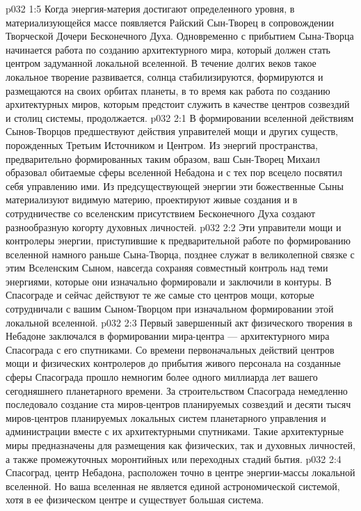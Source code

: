 \vs p032 1:5 \pc Когда энергия\hyp{}материя достигают определенного уровня, в материализующейся массе появляется Райский Сын\hyp{}Творец в сопровождении Творческой Дочери Бесконечного Духа. Одновременно с прибытием Сына\hyp{}Творца начинается работа по созданию архитектурного мира, который должен стать центром задуманной локальной вселенной. В течение долгих веков такое локальное творение развивается, солнца стабилизируются, формируются и размещаются на своих орбитах планеты, в то время как работа по созданию архитектурных миров, которым предстоит служить в качестве центров созвездий и столиц системы, продолжается.
\vs p032 2:1 В формировании вселенной действиям Сынов\hyp{}Творцов предшествуют действия управителей мощи и других существ, порожденных Третьим Источником и Центром. Из энергий пространства, предварительно формированных таким образом, ваш Сын\hyp{}Творец Михаил образовал обитаемые сферы вселенной Небадона и с тех пор всецело посвятил себя управлению ими. Из предсуществующей энергии эти божественные Сыны материализуют видимую материю, проектируют живые создания и в сотрудничестве со вселенским присутствием Бесконечного Духа создают разнообразную когорту духовных личностей.
\vs p032 2:2 Эти управители мощи и контролеры энергии, приступившие к предварительной работе по формированию вселенной намного раньше Сына\hyp{}Творца, позднее служат в великолепной связке с этим Вселенским Сыном, навсегда сохраняя совместный контроль над теми энергиями, которые они изначально формировали и заключили в контуры. В Спасограде и сейчас действуют те же самые сто центров мощи, которые сотрудничали с вашим Сыном\hyp{}Творцом при изначальном формировании этой локальной вселенной.
\vs p032 2:3 \pc Первый завершенный акт физического творения в Небадоне заключался в формировании мира\hyp{}центра --- архитектурного мира Спасограда с его спутниками. Со времени первоначальных действий центров мощи и физических контролеров до прибытия живого персонала на созданные сферы Спасограда прошло немногим более одного миллиарда лет вашего сегодняшнего планетарного времени. За строительством Спасограда немедленно последовало создание ста миров\hyp{}центров планируемых созвездий и десяти тысяч миров\hyp{}центров планируемых локальных систем планетарного управления и администрации вместе с их архитектурными спутниками. Такие архитектурные миры предназначены для размещения как физических, так и духовных личностей, а также промежуточных моронтийных или переходных стадий бытия.
\vs p032 2:4 Спасоград, центр Небадона, расположен точно в центре энергии\hyp{}массы локальной вселенной. Но ваша вселенная не является единой астрономической системой, хотя в ее физическом центре и существует большая система.
